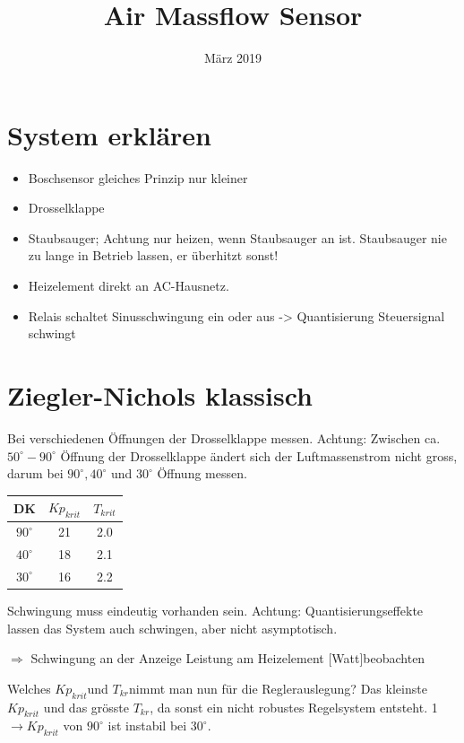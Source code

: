 \documentclass[a4paper,10pt,oneside]{article}
\title{Air Massflow Sensor}
\date{März 2019}
\begin{document}
\maketitle
\mbox{}
\thispagestyle{empty}
\newpage
\pagestyle{plain}

\tableofcontents
\newpage

\section{System erklären}
\begin{itemize}
\item Boschsensor gleiches Prinzip nur kleiner
\item Drosselklappe
\item Staubsauger; Achtung nur heizen, wenn Staubsauger an ist. Staubsauger nie zu lange  in Betrieb lassen, er überhitzt sonst!
\item Heizelement direkt an AC-Hausnetz.
\item  Relais schaltet Sinusschwingung ein oder aus -> Quantisierung Steuersignal schwingt
\end{itemize}


\section{Ziegler-Nichols klassisch}
Bei verschiedenen Öffnungen der Drosselklappe messen.
Achtung: Zwischen ca. $50^\circ - 90^\circ$ Öffnung der Drosselklappe ändert sich der Luftmassenstrom nicht gross, darum bei $90^\circ, 40^\circ$ und $30^\circ $ Öffnung messen.
\begin{center}
\begin{tabular}{| c | c | c |}
\hline
DK & $Kp_{krit}$ & $T_{krit}$\\ \hline
$90^\circ$ & 21 & 2.0\\ \hline
$40^\circ$ & 18 & 2.1\\ \hline
$30^\circ$ & 16 & 2.2\\ \hline
\end{tabular}
\end{center}

Schwingung muss eindeutig vorhanden sein. Achtung: Quantisierungseffekte lassen das System auch schwingen, aber nicht asymptotisch.

$\Rightarrow$ Schwingung an der Anzeige \glqq Leistung am Heizelement [Watt]\grqq beobachten

Welches $Kp_{krit} $und $T_{kr} $nimmt man nun für die Reglerauslegung? Das kleinste $Kp_{krit}$ und das grösste $T_{kr}$, da sonst ein nicht robustes Regelsystem entsteht. 1$\rightarrow Kp_{krit} $ von $ 90^\circ$ ist instabil bei $30^\circ$.
\end{document}

